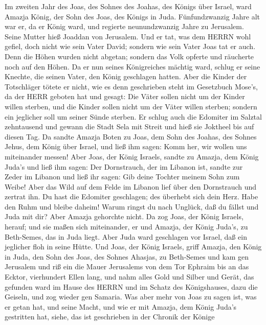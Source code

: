  Im zweiten Jahr des Joas, des Sohnes des Joahas, des Königs
über Israel, ward Amazja König, der Sohn des Joas, des Königs in Juda.
 Fünfundzwanzig Jahre alt war er, da er König ward, und
regierte neunundzwanzig Jahre zu Jerusalem. Seine Mutter hieß Joaddan
von Jerusalem.  Und er tat, was dem HERRN wohl gefiel, doch
nicht wie sein Vater David; sondern wie sein Vater Joas tat er auch.
 Denn die Höhen wurden nicht abgetan; sondern das Volk
opferte und räucherte noch auf den Höhen.  Da er nun seines
Königreiches mächtig ward, schlug er seine Knechte, die seinen Vater,
den König geschlagen hatten.  Aber die Kinder der
Totschläger tötete er nicht, wie es denn geschrieben steht im Gesetzbuch
Mose's, da der HERR geboten hat und gesagt: Die Väter sollen nicht um
der Kinder willen sterben, und die Kinder sollen nicht um der Väter
willen sterben; sondern ein jeglicher soll um seiner Sünde sterben.
 Er schlug auch die Edomiter im Salztal zehntausend und
gewann die Stadt Sela mit Streit und hieß sie Joktheel bis auf diesen
Tag.  Da sandte Amazja Boten zu Joas, dem Sohn des Joahas,
des Sohnes Jehus, dem König über Israel, und ließ ihm sagen: Komm her,
wir wollen uns miteinander messen!  Aber Joas, der König
Israels, sandte zu Amazja, dem König Juda's und ließ ihm sagen: Der
Dornstrauch, der im Libanon ist, sandte zur Zeder im Libanon und ließ
ihr sagen: Gib deine Tochter meinem Sohn zum Weibe! Aber das Wild auf
dem Felde im Libanon lief über den Dornstrauch und zertrat ihn.
 Du hast die Edomiter geschlagen; des überhebt sich dein
Herz. Habe den Ruhm und bleibe daheim! Warum ringst du nach Unglück, daß
du fällst und Juda mit dir?  Aber Amazja gehorchte nicht.
Da zog Joas, der König Israels, herauf; und sie maßen sich miteinander,
er und Amazja, der König Juda's, zu Beth-Semes, das in Juda liegt.
 Aber Juda ward geschlagen vor Israel, daß ein jeglicher
floh in seine Hütte.  Und Joas, der König Israels, griff
Amazja, den König in Juda, den Sohn des Joas, des Sohnes Ahasjas, zu
Beth-Semes und kam gen Jerusalem und riß ein die Mauer Jerusalems von
dem Tor Ephraim bis an das Ecktor, vierhundert Ellen lang, 
und nahm alles Gold und Silber und Gerät, das gefunden ward im Hause des
HERRN und im Schatz des Königshauses, dazu die Geiseln, und zog wieder
gen Samaria.  Was aber mehr von Joas zu sagen ist, was er
getan hat, und seine Macht, und wie er mit Amazja, dem König Juda's
gestritten hat, siehe, das ist geschrieben in der Chronik der Könige
